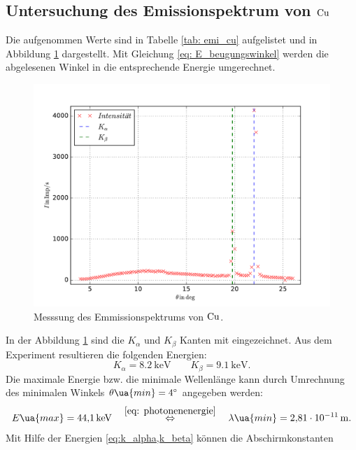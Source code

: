 \FloatBarrier
\subsection{Untersuchung des Emissionspektrum von $\ce{Cu}$}
Die aufgenommen Werte sind in Tabelle \ref{tab: emi_cu} aufgelistet und in Abbildung \ref{fig: emission_cu} dargestellt.
Mit Gleichung \eqref{eq: E_beugungswinkel} werden die abgelesenen Winkel in die entsprechende Energie umgerechnet.

\begin{figure}
  \centering
  \includegraphics[width=1 \textwidth]{../Messdaten/emission_cu.pdf}
  \caption{Messsung des Emmissionspektrums von $\ce{Cu}$.}
  \label{fig: emission_cu}
\end{figure}
In der Abbildung \ref{fig: emission_cu} sind die $K_\alpha$ und $K_\beta$ Kanten mit eingezeichnet. %
Aus dem Experiment resultieren die folgenden Energien:
\begin{equation}
  \label{eq:k_alpha,k_beta}
  K_\alpha=\SI{8.2}{\kilo\eV} \qquad   K_\beta=\SI{9.1}{\kilo\eV}.
\end{equation}
Die maximale Energie bzw. die minimale Wellenlänge kann durch Umrechnung des minimalen %
Winkels $\theta\ua{min}=\SI{4}{\degree}$ angegeben werden:
\begin{equation}
  \label{eq: maximale_energie}
  E\ua{max}=\SI{44.1}{\kilo\eV} \quad \overset{\eqref{eq: photonenenergie}}{\Leftrightarrow} \quad \lambda\ua{min}=\SI{2.81e-11}{\meter}.
\end{equation}
Mit Hilfe der Energien \eqref{eq:k_alpha,k_beta} können die Abschirmkonstanten %
